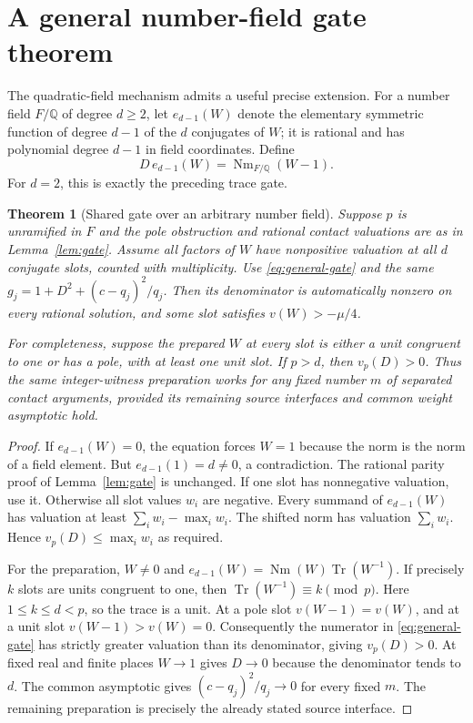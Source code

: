 \documentclass[11pt]{article}
\newtheorem{theorem}{Theorem}
\theoremstyle{remark}\newtheorem{remark}[theorem]{Remark}
\newcommand{\Q}{\mathbb Q}\newcommand{\Z}{\mathbb Z}
\newcommand{\Tr}{\operatorname{Tr}}\newcommand{\Nm}{\operatorname{Nm}}
\begin{document}
\section{A general number-field gate theorem}
The quadratic-field mechanism admits a useful precise extension.
For a number field $F/\Q$ of degree $d\ge2$, let
$e_{d-1}(W)$ denote the elementary symmetric function of degree $d-1$
of the $d$ conjugates of $W$; it is rational and has polynomial degree
$d-1$ in field coordinates. Define
\begin{equation}\label{eq:general-gate}
 D\,e_{d-1}(W)=\Nm_{F/\Q}(W-1).
\end{equation}
For $d=2$, this is exactly the preceding trace gate.

\begin{theorem}[Shared gate over an arbitrary number field]
Suppose $p$ is unramified in $F$ and the pole obstruction and rational
contact valuations are as in Lemma~\ref{lem:gate}. Assume all factors
of $W$ have nonpositive valuation at all $d$ conjugate slots, counted
with multiplicity. Use \eqref{eq:general-gate} and the same
$g_j=1+D^2+(c-q_j)^2/q_j$. Then its denominator is automatically
nonzero on every rational solution, and some slot satisfies
$v(W)>-\mu/4$.

For completeness, suppose the prepared $W$ at every slot is either a
unit congruent to one or has a pole, with at least one unit slot.
If $p>d$, then $v_p(D)>0$. Thus the same integer-witness preparation
works for any fixed number $m$ of separated contact arguments, provided
its remaining source interfaces and common weight asymptotic hold.
\end{theorem}
\begin{proof}
If $e_{d-1}(W)=0$, the equation forces $W=1$ because the norm is the
norm of a field element. But $e_{d-1}(1)=d\ne0$, a contradiction.
The rational parity proof of Lemma~\ref{lem:gate} is unchanged.
If one slot has nonnegative valuation, use it. Otherwise all slot
values $w_i$ are negative. Every summand of $e_{d-1}(W)$ has valuation
at least $\sum_iw_i-\max_iw_i$. The shifted norm has valuation
$\sum_iw_i$. Hence $v_p(D)\le\max_iw_i$ as required.

For the preparation, $W\ne0$ and
$e_{d-1}(W)=\Nm(W)\Tr(W^{-1})$.
If precisely $k$ slots are units congruent to one, then
$\Tr(W^{-1})\equiv k\pmod p$. Here $1\le k\le d<p$, so the trace
is a unit. At a pole slot $v(W-1)=v(W)$, and at a unit slot
$v(W-1)>v(W)=0$. Consequently the numerator in
\eqref{eq:general-gate} has strictly greater valuation than its
denominator, giving $v_p(D)>0$.
At fixed real and finite places $W\to1$ gives $D\to0$ because the
denominator tends to $d$. The common asymptotic gives
$(c-q_j)^2/q_j\to0$ for every fixed $m$. The remaining preparation
is precisely the already stated source interface.
\end{proof}
\end{document}
